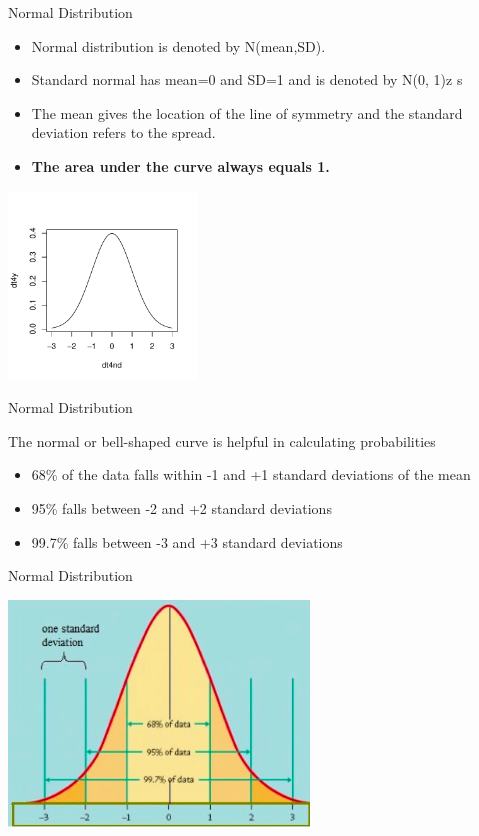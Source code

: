 \documentclass[14pt]{beamer}\usepackage[]{graphicx}\usepackage[]{color}
\begin{document}
\begin{frame}[fragile]{Normal Distribution}

\begin{minipage}[ht]{5cm}

{\footnotesize{
\begin{itemize}
\item Normal distribution is denoted by N(mean,SD).
\item Standard normal has mean=0 and SD=1 and is denoted  by N(0, 1)z s
\item The mean gives the location of the line of symmetry and the standard deviation refers to the spread. 
\item \textbf{The area  under the curve always equals 1.}
\end{itemize}
}}
\end{minipage}
\begin{minipage}[ht]{5cm}


\includegraphics[width=5cm]{figure/LBL6a-1} 


\end{minipage}
\end{frame}

\begin{frame}[fragile]{Normal Distribution}

The normal or bell-shaped curve is helpful in calculating  probabilities

\begin{itemize}
\item 68\% of the data falls within -1 and +1 standard  deviations of the mean
\item 95\% falls between -2 and +2 standard deviations
\item 99.7\% falls between -3 and +3 standard deviations
\end{itemize}
\end{frame}

\begin{frame}[fragile]{Normal Distribution}

\includegraphics[width=8cm]{chapters/chapter6/ext_figure/norm1.png}

\end{frame}
\end{document}
